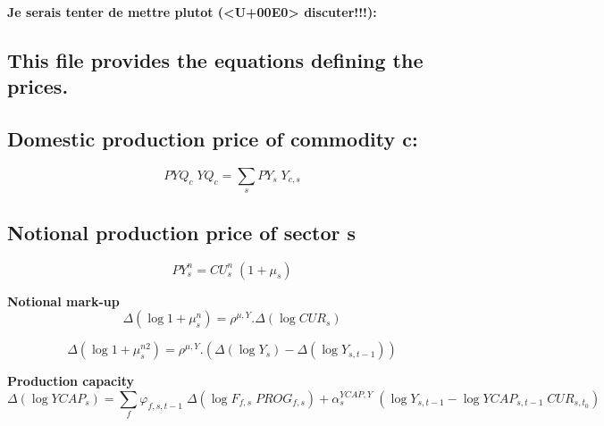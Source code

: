 \documentclass[12pt]{article}
\numberwithin{equation}{section}
\begin{document}
\textbf{Je serais tenter de mettre plutot (<U+00E0> discuter!!!):}






\subsection{This file provides the equations defining the prices.}





\subsection{Domestic production price of commodity c:}


\begin{dmath}
PYQ_{c} \; YQ_{c} = \sum_{s} PY_{s} \; Y_{c, s}
\end{dmath}



\subsection{Notional production price of sector s}


\begin{dmath}
PY^{n}_{s} = CU^{n}_{s} \; \left( 1 + \mu_{s} \right)
\end{dmath}

\textbf{Notional mark-up}
\begin{dmath}
\varDelta \left(\operatorname{log} 1 + \mu^{n}_{s}\right) = \rho^{\mu,Y} . \varDelta \left(\operatorname{log} CUR_{s}\right)
\end{dmath}

\begin{dmath}
\varDelta \left(\operatorname{log} 1 + \mu^{n2}_{s}\right) = \rho^{\mu,Y} . \left( \varDelta \left(\operatorname{log} Y_{s}\right) - \varDelta \left(\operatorname{log} Y_{s, t-1}\right) \right)
\end{dmath}






\textbf{Production capacity}
\begin{dmath}
\varDelta \left(\operatorname{log} YCAP_{s}\right) = \sum_{f} \varphi_{f, s, t-1} \; \varDelta \left(\operatorname{log} F_{f, s} \; PROG_{f, s}\right) + \alpha^{YCAP,Y}_{s} \; \left( \operatorname{log} Y_{s, t-1} - \operatorname{log} YCAP_{s, t-1} \; CUR_{s, t_{0}} \right)
\end{dmath}
\end{document}

